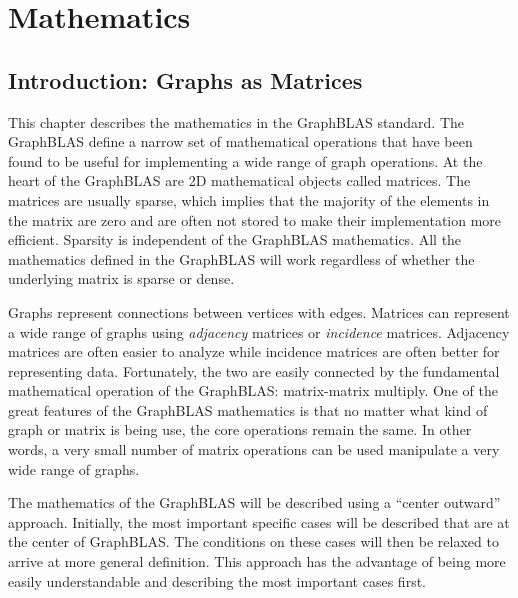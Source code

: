 %

%

\chapter{Mathematics}
\label{chap:mathematics}
\section{Introduction: Graphs as Matrices}
This chapter describes the mathematics in the GraphBLAS standard.  The GraphBLAS define a narrow set of mathematical operations that have been found to be useful for implementing a wide range of graph operations.  At the heart of the GraphBLAS are 2D mathematical objects called matrices.  The matrices are usually sparse, which implies that the majority of the elements in the matrix are zero and are often not stored to make their implementation more efficient.  Sparsity is independent of the GraphBLAS mathematics.  All the mathematics defined in the GraphBLAS will work regardless of whether the underlying matrix is sparse or dense.

Graphs represent connections between vertices with edges.  Matrices can represent a wide range of graphs using \emph{adjacency} matrices or \emph{incidence} matrices.  Adjacency matrices are often easier to analyze while incidence matrices are often better for representing data.  Fortunately, the two are easily connected by the fundamental mathematical operation of the GraphBLAS: matrix-matrix multiply.  One of the great features of the GraphBLAS mathematics is that no matter what kind of graph or matrix is being use, the core operations remain the same.  In other words, a very small number of matrix operations can be used manipulate a very wide range of graphs.

The mathematics of the GraphBLAS will be described using a ``center outward'' approach.  Initially, the most important specific cases will be described that are at the center of GraphBLAS.  The conditions on these cases will then be relaxed to arrive at more general definition.  This approach has the advantage of being more easily understandable and describing the most important cases first.

